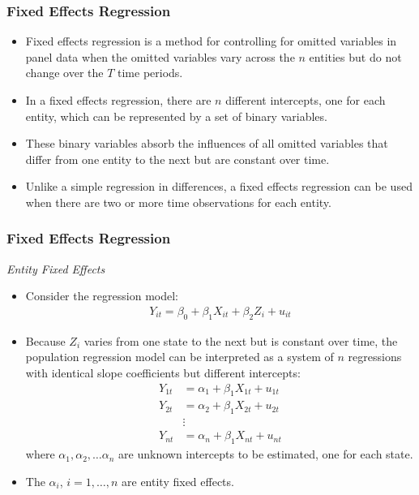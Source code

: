 

\begin{frame}
\frametitle{Fixed Effects Regression}
\begin{itemize}
\item Fixed effects regression is a method for controlling for omitted variables in panel data when the omitted variables vary across the $n$ entities but do not change over the $T$ time periods. 
\item In a fixed effects regression, there are $n$ different intercepts, one for each entity, which can be represented by a set of binary variables. 
\item These binary variables absorb the influences of all omitted variables that differ from one entity to the next but are constant over time.
\item Unlike a simple regression in differences, a fixed effects regression can be used when there are two or more time observations for each entity.
\end{itemize}
\end{frame}


\begin{frame}
\frametitle{Fixed Effects Regression}
\emph{Entity Fixed Effects}
\begin{itemize}
\item Consider the regression model:
\begin{align*}
Y_{it} = \beta_{0} + \beta_{1} X_{it} + \beta_{2} Z_{i} + u_{it}
\end{align*}
\item Because $Z_{i}$ varies from one state to the next but is constant over time, the population regression model can be interpreted as a system of $n$ regressions with identical slope coefficients but different intercepts:
\begin{align*}
Y_{1t} & = \alpha_{1} + \beta_{1} X_{1t} + u_{1t} \\
Y_{2t} & = \alpha_{2} + \beta_{1} X_{2t} + u_{2t} \\
       & \vdots \\
Y_{nt} & = \alpha_{n} + \beta_{1} X_{nt} + u_{nt} 
\end{align*}
where $\alpha_{1},\alpha_{2},\ldots\alpha_{n}$ are unknown intercepts to be estimated, one for each state.
\item The $\alpha_{i}$, $i=1,\ldots,n$ are entity fixed effects.
\end{itemize}
\end{frame}


